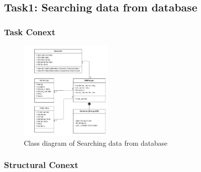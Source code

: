 \documentclass[conference]{IEEEtran}
\begin{document}
\subsection{\textbf{Task1: Searching data from database }}


\subsubsection{\textbf{Task Conext }}

\begin{figure}[htbp]
	\centerline{\includegraphics[width=0.4\textwidth]{image/searching hotel class1.pdf}}
	\caption{Class diagram of Searching data from database }
	\label{class1}
\end{figure}

\subsubsection{\textbf{Structural Conext }}
\end{document}
